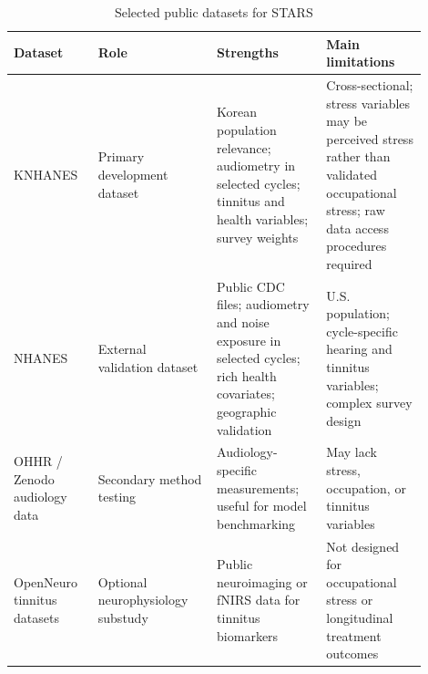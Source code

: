 \begin{table}[htbp]
\centering
\caption{Selected public datasets for STARS}
\label{tab:datasets}
\begin{tabular}{p{0.18\linewidth}p{0.26\linewidth}p{0.24\linewidth}p{0.22\linewidth}}
\toprule
Dataset & Role & Strengths & Main limitations \\
\midrule
KNHANES & Primary development dataset & Korean population relevance; audiometry in selected cycles; tinnitus and health variables; survey weights & Cross-sectional; stress variables may be perceived stress rather than validated occupational stress; raw data access procedures required \\
NHANES & External validation dataset & Public CDC files; audiometry and noise exposure in selected cycles; rich health covariates; geographic validation & U.S. population; cycle-specific hearing and tinnitus variables; complex survey design \\
OHHR / Zenodo audiology data & Secondary method testing & Audiology-specific measurements; useful for model benchmarking & May lack stress, occupation, or tinnitus variables \\
OpenNeuro tinnitus datasets & Optional neurophysiology substudy & Public neuroimaging or fNIRS data for tinnitus biomarkers & Not designed for occupational stress or longitudinal treatment outcomes \\
\bottomrule
\end{tabular}
\end{table}
